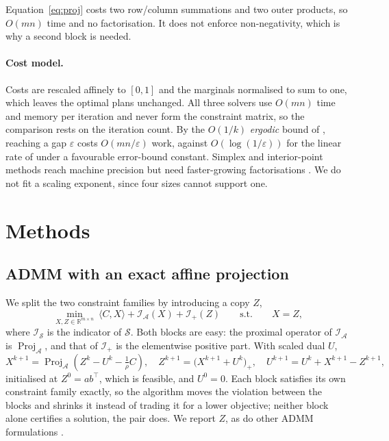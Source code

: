 \documentclass{article}
\newcommand{\R}{\mathbb{R}}
\newcommand{\Proj}{\operatorname{Proj}}
\begin{document}
Equation~\eqref{eq:proj} costs two row/column summations and two outer products, so
$O(mn)$ time and no factorisation. It does not enforce non-negativity, which is why a
second block is needed.

\paragraph{Cost model.}
Costs are rescaled affinely to $[0,1]$ and the marginals normalised to sum to one, which
leaves the optimal plans unchanged. All three solvers use $O(mn)$ time and memory per
iteration and never form the constraint matrix, so the comparison rests on the iteration
count. By the $O(1/k)$ \emph{ergodic} bound of \citet{he2012rate}, reaching a gap
$\varepsilon$ costs $O(mn/\varepsilon)$ work, against $O(\log(1/\varepsilon))$ for the
linear rate of \citet{yang2016linear} under a favourable error-bound constant. Simplex
and interior-point methods reach machine precision but need faster-growing factorisations
\citep{applegate2021pdlp}. We do not fit a scaling exponent, since four sizes cannot
support one.

\section{Methods}
\label{sec:methods}

\subsection{ADMM with an exact affine projection}
\label{sec:admm}

We split the two constraint families by introducing a copy $Z$,
\begin{equation}
\label{eq:splitting}
\min_{X,Z\in\R^{m\times n}}\ \langle C,X\rangle+\mathcal I_{\mathcal A}(X)
+\mathcal I_{+}(Z)\qquad\text{s.t.}\qquad X=Z ,
\end{equation}
where $\mathcal I_{\mathcal S}$ is the indicator of $\mathcal S$. Both blocks are easy:
the proximal operator of $\mathcal I_{\mathcal A}$ is $\Proj_{\mathcal A}$, and that of
$\mathcal I_+$ is the elementwise positive part. With scaled dual $U$,
\begin{equation}
\label{eq:admm}
X^{k+1}=\Proj_{\mathcal A}\!\left(Z^k-U^k-\tfrac1\rho C\right),\quad
Z^{k+1}=\bigl(X^{k+1}+U^k\bigr)_+ ,\quad
U^{k+1}=U^k+X^{k+1}-Z^{k+1},
\end{equation}
initialised at $Z^0=ab^\top$, which is feasible, and $U^0=0$. Each block satisfies its
own constraint family exactly, so the algorithm moves the violation between the blocks
and shrinks it instead of trading it for a lower objective; neither block alone certifies
a solution, the pair does. We report $Z$, as do other ADMM formulations
\citep{boyd2011admm}.
\end{document}
